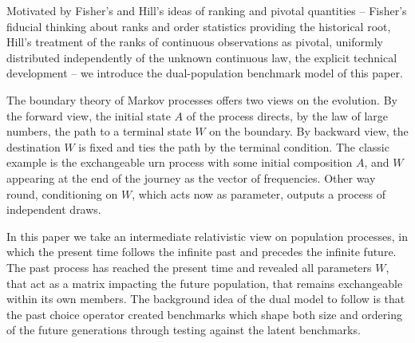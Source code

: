 \documentclass[11pt]{article}
\theoremstyle{plain}
\theoremstyle{definition}
\begin{document}
Motivated by Fisher's and Hill's \cite{Fisher,Hill} ideas of ranking and pivotal quantities -- Fisher's fiducial thinking about ranks and order statistics providing the historical root, Hill's treatment of the ranks of continuous observations as pivotal, uniformly distributed independently of the unknown continuous law, the explicit technical development -- we introduce the dual-population benchmark model of this paper.

The boundary theory of Markov processes offers two views on the evolution. By the forward view, the initial state $A$ of the process directs, by the law of large numbers,
 the path to a terminal state $W$ on the boundary. By backward view, the destination $W$ is fixed and ties  the path by the terminal condition. The classic example is the 
exchangeable urn process  with some initial composition $A$, and $W$ appearing at the end of the journey as the vector of frequencies. Other way round, conditioning on $W$,
which acts now as parameter, outputs a process of independent   draws.

In this paper we take an intermediate  relativistic view on  population processes,   in which the present time follows the infinite past and precedes the infinite future. 
The past process has reached the present time and revealed all parameters
 \({W}\), that  act as a matrix  impacting the future population,
 that  remains exchangeable within  its own members. The background idea of the dual model to follow is that the past  choice operator 
created benchmarks which shape both size and ordering of the future generations through testing against the latent benchmarks.
\end{document}
